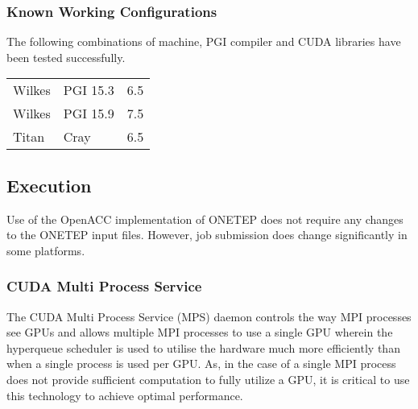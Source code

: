 \documentclass[letterpaper,10pt,english]{sphinxmanual}
\begin{document}


\subsubsection{Known Working Configurations}
\label{\detokenize{ONETEP_OpenACC:known-working-configurations}}
The following combinations of machine, PGI compiler and CUDA libraries
have been tested successfully.


\begin{savenotes}\sphinxattablestart
\centering
\begin{tabulary}{\linewidth}[t]{|T|T|T|}
\hline

&
&
\\
\hline
Wilkes
&
PGI 15.3
&
6.5
\\
\hline
Wilkes
&
PGI 15.9
&
7.5
\\
\hline
Titan
&
Cray
&
6.5
\\
\hline
\end{tabulary}
\par
\sphinxattableend\end{savenotes}


\subsection{Execution}
\label{\detokenize{ONETEP_OpenACC:execution}}
Use of the OpenACC implementation of ONETEP does not require any changes
to the ONETEP input files. However, job submission does change
significantly in some platforms.


\subsubsection{CUDA Multi Process Service}
\label{\detokenize{ONETEP_OpenACC:cuda-multi-process-service}}
The CUDA Multi Process Service (MPS) daemon controls the way MPI
processes see GPUs and allows multiple MPI processes to use a single GPU
wherein the hyperqueue scheduler is used to utilise the hardware much
more efficiently than when a single process is used per GPU. As, in the
case of a single MPI process does not provide sufficient computation to
fully utilize a GPU, it is critical to use this technology to achieve
optimal performance.
\end{document}
